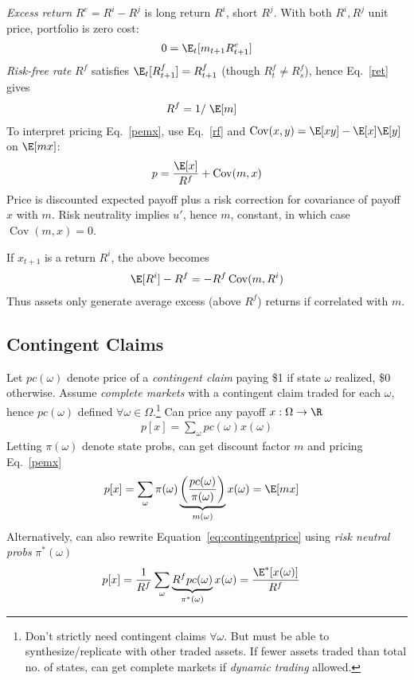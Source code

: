 \documentclass[12pt]{article}
\theoremstyle{plain}
\theoremstyle{definition}
\theoremstyle{remark}
\newcommand{\ra}{\rightarrow}
\newcommand{\Cov}{\operatorname{Cov}}
\begin{document}
\begin{multicols*}{2}
\emph{Excess return} $R^e=R^i-R^j$ is long return $R^i$, short $R^j$.
With both $R^i,R^j$ unit price, portfolio is zero cost:
\begin{align*}
  0 = \E_t[m_{t+1}R^e_{t+1}]
\end{align*}
\emph{Risk-free rate} $R^f$ satisfies $\E_t[R^f_{t+1}]=R^f_{t+1}$
(though $R^f_t\neq R^f_s$), hence Eq.~\ref{ret} gives
\begin{align}
  R^f
  &= 1/\;\E[m]
  \label{rf}
\end{align}
To interpret pricing Eq.~\ref{pemx}, use Eq.~\ref{rf} and
$\Cov(x,y)=\E[xy] - \E[x]\E[y]$ on $\E[mx]$:
\begin{align}
  p =  \frac{\E[x]}{R^f} + \Cov(m,x)
  \label{riskadj}
\end{align}
Price is discounted expected payoff plus a risk
correction for covariance of payoff $x$ with $m$.
Risk neutrality implies $u'$, hence $m$, constant, in which case
$\Cov(m,x)=0$.

If $x_{t+1}$ is a return $R^i$, the above becomes
\begin{align}
  \E[R^i] - R^f =  -R^f \Cov(m,R^i)
  \label{riskadjret}
\end{align}
Thus assets only generate average excess (above $R^f$) returns if
correlated with $m$.

\subsection{Contingent Claims}

Let $pc(\omega)$ denote price of a \emph{contingent claim} paying \$1
if state $\omega$ realized, \$0 otherwise.
Assume \emph{complete markets} with a contingent claim traded
for each $\omega$, hence $pc(\omega)$ defined $\forall
\omega\in\Omega$.\footnote{
  Don't strictly need contingent claims $\forall\omega$.
  But must be able to synthesize/replicate with other traded assets.
  If fewer assets traded than total no. of states, can get
  complete markets if \emph{dynamic trading} allowed.
}
Can price any payoff $x:\Omega\ra\R$
\begin{align}
  p[x]
  = \sum_\omega pc(\omega) x(\omega)
  \label{eq:contingentprice}
\end{align}
Letting $\pi(\omega)$ denote state probs, can get discount factor $m$
and pricing Eq.~\ref{pemx}
\begin{align*}
  p[x]
  &= \sum_\omega
  \pi(\omega)
  \underbrace{%
  \left(
  \frac{pc(\omega)}{\pi(\omega)}
  \right)
  }_{m(\omega)}
  x(\omega)
  = \E[mx]
\end{align*}
Alternatively, can also rewrite Equation~\ref{eq:contingentprice} using
\emph{risk neutral probs} $\pi^*(\omega)$
\begin{align*}
  p[x]
  &= \frac{1}{R^f} \sum_\omega
  \underbrace{R^f pc(\omega)}_{\pi^*(\omega)}x(\omega)
  = \frac{\E^*[x(\omega)]}{R^f}
\end{align*}



\end{multicols*}
\end{document}
